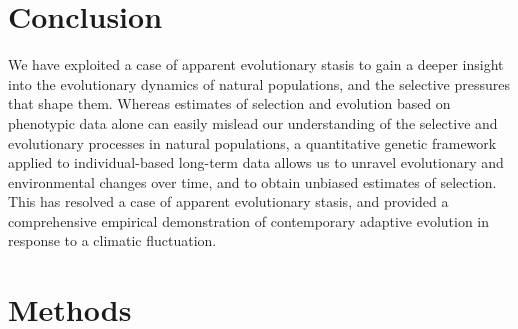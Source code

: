 \section{Conclusion}
We have exploited a case of apparent evolutionary stasis to gain a deeper insight into the evolutionary dynamics of natural populations, and the selective pressures that shape them. Whereas estimates of selection and evolution based on phenotypic data alone can easily mislead our understanding of the selective and evolutionary processes in natural populations, a quantitative genetic framework applied to individual-based long-term data allows us to unravel evolutionary and environmental changes over time, and to obtain unbiased estimates of selection. This has resolved a case of apparent evolutionary stasis, and provided a comprehensive empirical demonstration of contemporary adaptive evolution in response to a climatic fluctuation. 

\section{Methods}
